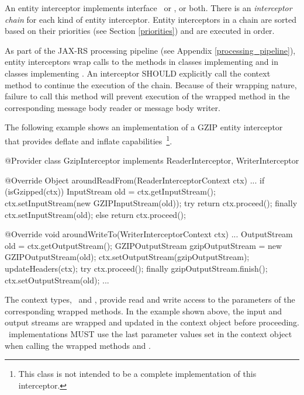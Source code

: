 An entity interceptor implements interface \ReaderInterceptor\ or \WriterInterceptor, or both. There is an \emph{interceptor chain} for each kind of entity interceptor. Entity interceptors in a chain are sorted based on their priorities (see Section \ref{priorities}) and are executed in order. 

As part of the JAX-RS processing pipeline (see Appendix \ref{processing_pipeline}), entity interceptors wrap calls to the methods  in classes implementing  and  in classes implementing . An interceptor SHOULD explicitly call the context method  to continue the execution of the chain. Because of their wrapping nature, failure to call this method will prevent execution of the wrapped method in the corresponding message body reader or message body writer.

The following example shows an implementation of a GZIP entity interceptor that provides deflate and inflate capabilities~\footnote{This class is not intended to be a complete implementation of this interceptor.}.

\begin{listing}{1}
@Provider
class GzipInterceptor implements ReaderInterceptor, WriterInterceptor {

    @Override
    Object aroundReadFrom(ReaderInterceptorContext ctx) ... {
        if (isGzipped(ctx)) {
            InputStream old = ctx.getInputStream();
            ctx.setInputStream(new GZIPInputStream(old));
            try {
                return ctx.proceed();
            } finally {
                ctx.setInputStream(old);
            }
        } else {
            return ctx.proceed();
        }
    }

    @Override
    void aroundWriteTo(WriterInterceptorContext ctx) ... {
        OutputStream old = ctx.getOutputStream();
        GZIPOutputStream gzipOutputStream = new GZIPOutputStream(old);
        ctx.setOutputStream(gzipOutputStream);
        updateHeaders(ctx);
        try {
            ctx.proceed();
        } finally {
            gzipOutputStream.finish();
            ctx.setOutputStream(old);
        }
    }
    ...
}
\end{listing}

The context types, \ReaderInterceptorContext\ and \WriterInterceptorContext, provide read and write access to the parameters of the corresponding wrapped methods. In the example shown above, the input and output streams are wrapped and updated in the context object before proceeding. \jaxrs\ implementations MUST use the last parameter values set in the context object when calling the wrapped methods  and .

